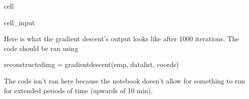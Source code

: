 \documentclass[letterpaper,10pt,english]{jupyterBook}
\begin{document}
\begin{sphinxuseclass}{cell}
\begin{sphinxVerbatimInput}
\begin{sphinxuseclass}{cell_input}
\begin{sphinxVerbatim}[commandchars=\\\{\}]
               
          
            
             
     
\end{sphinxVerbatim}

\end{sphinxuseclass}\end{sphinxVerbatimInput}

\end{sphinxuseclass}
\sphinxAtStartPar
Here is what the gradient descent’s output looks like after 1000 iterations. The code should be ran using

\begin{sphinxVerbatim}[commandchars=\\\{\}]
reconstructed\PYGZus{}img = gradient\PYGZus{}descent(emp, data\PYGZus{}list, coords)
\end{sphinxVerbatim}

\sphinxAtStartPar
The code isn’t ran here because the notebook doesn’t allow for something to run for extended periods of time (upwards of 10 min).
\end{document}
